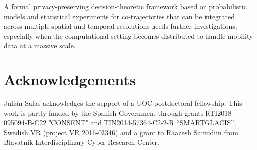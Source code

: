 \documentclass[times,twocolumn,final,authoryear]{elsarticle}
\begin{document}
A formal privacy-preserving decision-theoretic framework based on probabilistic models and statistical experiments for co-trajectories that can be integrated across multiple spatial and temporal resolutions needs further investigations, especially when the computational setting becomes distributed to handle mobility data at a massive scale.

\section*{Acknowledgements}
Juli\'{a}n Salas acknowledges the support of a UOC postdoctoral fellowship.
This work is partly funded by the Spanish Government through grants  RTI2018-095094-B-C22 "CONSENT" and TIN2014-57364-C2-2-R ``SMARTGLACIS'', Swedish VR (project VR 2016-03346) and a grant to Raazesh Sainudiin from Blavatnik Interdisciplinary Cyber Research Center.





\end{document}
